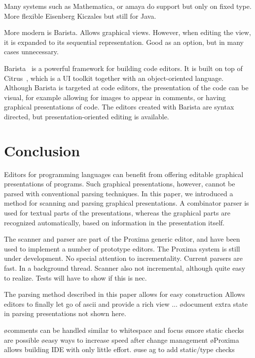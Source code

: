 \documentclass[12pt]{article}
\begin{document}
Many systems such as Mathematica, or amaya do support  but only on fixed type. More flexible Eisenberg Kiczales but still for Java. 

More modern is Barista. Allows graphical views. However, when editing the view, it is expanded to its sequential representation. Good as an option, but in many cases unnecessary. 



\noindent Barista~\cite{KoMyers06Barista} is a powerful framework for building code editors. It is built on top of Citrus~\cite{KoMyers05Citrus}, which is a UI toolkit together with an object-oriented language. Although Barista is targeted at code editors, the presentation of the code can be visual, for example allowing for images to appear in comments, or having graphical presentations of code. The editors created with Barista are syntax directed, but presentation-oriented editing is available. 

\ec



%
\section{Conclusion}\label{sect:conclusion}
%


Editors for programming languages can benefit from offering editable graphical presentations of programs. Such graphical presentations, however, cannot be parsed with conventional parsing techniques. In this paper, we introduced a method for scanning and parsing graphical presentations.  A combinator parser is used for textual parts of the presentations, whereas the graphical parts are recognized automatically, based on information in the presentation itself.

The scanner and parser are part of the Proxima generic editor, and have been used to implement a number of prototype editors.
\bc
The Proxima system is still under development. No special attention to incrementality. Current parsers are fast. In a background thread. Scanner also not incremental, although quite easy to realize. Tests will have to show if this is nec.

The parsing method described in this paper allows for easy construction Allows editors to finally let go of ascii and provide a rich view ...
\ec
\bc
\bl
\o document extra state in parsing presentations not shown here.
\el

\bl
\o comments can be handled similar to whitespace and focus
\o more static checks are possible
\o easy ways to increase speed after change management
\o Proxima allows building IDE with only little effort.
\o use ag to add static/type checks
\el
\ec


%



\end{document}
